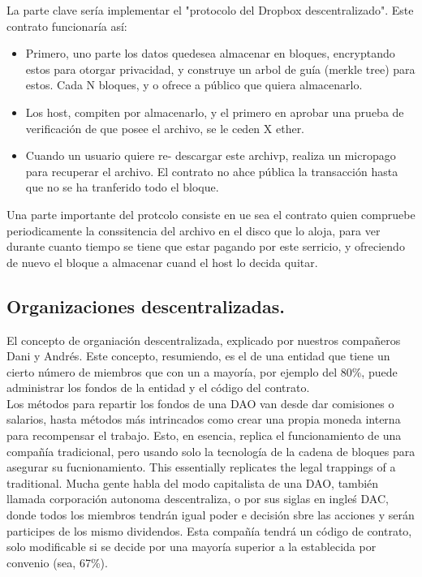 \documentclass[11pt,a4paper]{article}
\begin{document}
La parte clave sería implementar el "protocolo del Dropbox descentralizado". Este contrato funcionaría así:
\begin{itemize}
	\item Primero, uno parte los datos quedesea almacenar en bloques, encryptando estos para otorgar privacidad, y construye un arbol de guía (merkle tree) para estos. Cada N bloques, y o ofrece a público que quiera almacenarlo.
	\item Los host, compiten por almacenarlo, y el primero en aprobar una prueba de verificación de que posee el archivo, se le ceden X ether.
	\item Cuando un usuario quiere re- descargar este archivp, realiza un micropago para recuperar el archivo. El contrato no ahce pública la transacción hasta que no  se ha tranferido todo el bloque.
	
\end{itemize}

Una parte importante del protcolo consiste en ue sea el contrato quien compruebe periodicamente la conssitencia del archivo en el disco que lo aloja, para ver durante cuanto tiempo se tiene que estar pagando por este serricio, y ofreciendo de nuevo el bloque a almacenar cuand el host lo decida quitar.

\subsection{Organizaciones descentralizadas.}

El concepto de organiación descentralizada, explicado por nuestros compañeros Dani y Andrés. Este concepto, resumiendo, es el de una entidad que tiene un cierto número de miembros que con un a mayoría,  por ejemplo del 80\%, puede administrar los fondos de la entidad y el código del contrato.\\

Los métodos para repartir los fondos de una DAO van desde dar comisiones o salarios, hasta métodos más intrincados como crear una propia moneda interna para recompensar el trabajo. Esto, en esencia, replica el funcionamiento de una compañía tradicional, pero usando solo la tecnología de la cadena de bloques para asegurar su fucnionamiento. This essentially replicates the legal trappings of a traditional. Mucha gente habla del modo capitalista de una DAO, también llamada  corporación autonoma descentraliza, o por sus siglas en ingleś DAC, donde todos los miembros tendrán igual poder e decisión sbre las acciones y serán participes de los mismo dividendos. Esta compañía tendrá un código de contrato, solo modificable si se decide por una mayoría superior a la establecida por convenio (sea, 67\%).\\
\end{document}

